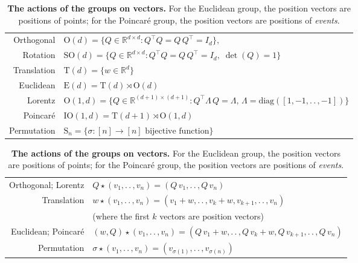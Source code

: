 \documentclass{article}
\theoremstyle{Hogg}
\renewcommand{\ldots}{.\,.\,}
\renewcommand{\cdots}{\ldots}
\begin{document}
\begin{table}[t]
    \begin{mdframed}%
    \centering%
    \begin{tabular}{rl}
    Orthogonal &
    $\text{O}(d) =\{ Q \in \mathbb R^{d\times d}: Q^\top Q = Q\,Q^\top = I_d\}, \label{eq.o}$
    \\[0.5ex]
    Rotation &
    $\text{SO}(d) =\{ Q \in \mathbb R^{d\times d}: Q^\top Q = Q\,Q^\top = I_d, \; \label{eq.so} \operatorname{det}(Q)=1\}$
    \\[0.5ex]
    Translation &
    $\text{T}(d) =\{ w \in \mathbb R^{d} \}$
    \\[0.5ex]
    Euclidean &
    $\text{E}(d) = \text{T}(d) \rtimes \text{O}(d)$
    \\[0.5ex]
    Lorentz &
    $\text{O}(1,d) =\{ Q \in \mathbb R^{(d+1)\times (d+1)}: Q^\top\Lambda\, Q =\Lambda, \,\Lambda=\text{diag}([1,-1,\ldots,-1]) \}$
    \\[0.5ex]
    Poincar\'e &
    $\text{IO}(1,d) = \text{T}(d+1) \rtimes \text{O}(1,d)$
    \\[0.5ex]
    Permutation & $\text{S}_n=\{\sigma:[n]\to [n] \text{ bijective function}\}$
    \\[1ex]
    \end{tabular}
    \caption{\textbf{The groups considered in this work.}}
    \label{tab.groups}
    \end{mdframed}
    \begin{mdframed}%
    \begin{tabular}{rl}
    Orthogonal; Lorentz &
    $Q\star(v_1,\cdots, v_n) = (Q\,v_1, \cdots, Q\,v_n)$
    \\[0.5ex]
    Translation &
    $w\star(v_1,\cdots, v_n) = (v_1 + w, \cdots, v_k + w, v_{k+1},\ldots, v_n)$
    \\
    & (where the first $k$ vectors are position vectors)
    \\[0.5ex]
    Euclidean; Poincar\'e &
    $(w,Q)\star(v_1,\cdots, v_n) = (Q\,v_1 + w, \cdots, Q\,v_k + w, Q\,v_{k+1}, \cdots, Q\,v_n)$ 
    \\[0.5ex]
    Permutation & $\sigma\star(v_1,\ldots, v_n)=(v_{\sigma(1)},\ldots,v_{\sigma(n)})$
    \\[1ex]
    \end{tabular}
    \caption{\textbf{The actions of the groups on vectors.} For the Euclidean group, the position vectors are positions of points; for the Poincar\'e group, the position vectors are positions of \emph{events}.}
    \label{tab.actions}
    \end{mdframed}
\end{table}
\end{document}
